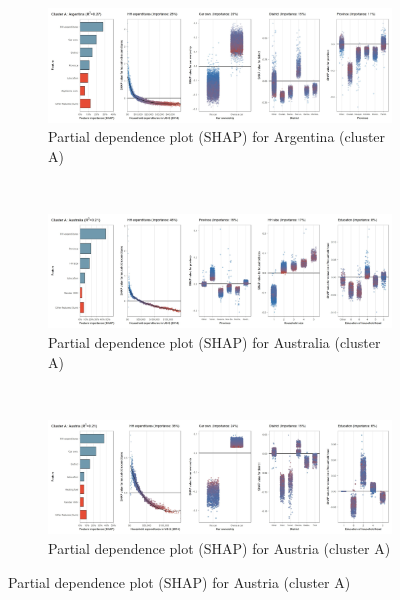 \begin{figure}[ht!]
     \centering
    \caption{Partial dependence plot (SHAP) for 88 countries and nine clusters}
    \label{fig:5b}
     \begin{subfigure}[b]{\textwidth}
         \centering
         \caption{Partial dependence plot (SHAP) for Argentina (cluster A)}
         \label{fig:5b_ARG}
         \includegraphics[width=\textwidth]{Figure 5b/Figure_5b_ARG} 
     \end{subfigure}
    \\
    \vspace{0.5cm}
     \begin{subfigure}[b]{\textwidth}
         \centering
         \caption{Partial dependence plot (SHAP) for Australia (cluster A)}
         \label{fig:5b_AUS}
         \includegraphics[width=\textwidth]{Figure 5b/Figure_5b_AUS}    \end{subfigure}
    \\
    \vspace{0.5cm}
     \begin{subfigure}[b]{1\textwidth}
     \centering
         \caption{Partial dependence plot (SHAP) for Austria (cluster A)}
         \label{fig:5b_AUT}
         \includegraphics[width=\textwidth]{Figure 5b/Figure_5b_AUT} 

\end{subfigure}
\end{figure}
